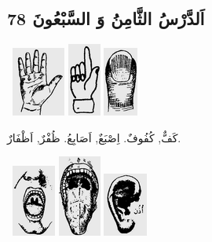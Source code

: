 \documentclass[a5paper]{article}
\begin{document}
\subsection{اَلدَّرْسُ الثَّامِنُ وَ السَّبْعُونَ 78}
\  \includegraphics[width=0.6874in,height=0.8957in]{MuhammadBagauddinlatinized-img229.png}   \includegraphics[width=0.4272in,height=0.948in]{MuhammadBagauddinlatinized-img230.png}   \includegraphics[width=0.448in,height=0.8957in]{MuhammadBagauddinlatinized-img231.png} 

كَفٌّ, كُفُوفٌ. اِصْبَعٌ, اَصَابِعُ. ظُفْرٌ, اَظْفَارٌ. 

\  \includegraphics[width=0.5626in,height=0.9272in]{MuhammadBagauddinlatinized-img232.png}   \includegraphics[width=0.552in,height=1.052in]{MuhammadBagauddinlatinized-img233.png}   \includegraphics[width=0.5728in,height=0.8228in]{MuhammadBagauddinlatinized-img234.png} 
\end{document}
